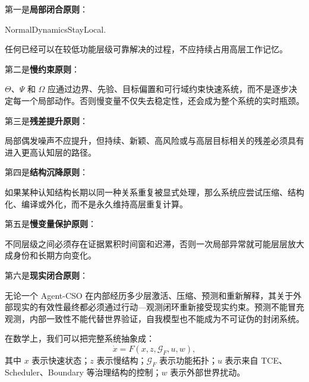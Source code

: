 第一是\textbf{局部闭合原则}：
\begin{statementbox}
NormalDynamicsStayLocal.
\end{statementbox}
任何已经可以在较低功能层级可靠解决的过程，不应持续占用高层工作记忆。

第二是\textbf{慢约束原则}：
\begin{statementbox}
\centering
{}
\end{statementbox}
$\Theta$、$\Psi$ 和 $\Omega$ 应通过边界、先验、目标偏置和可行域约束快速系统，而不是逐步决定每一个局部动作。否则慢变量不仅失去稳定性，还会成为整个系统的实时瓶颈。

第三是\textbf{残差提升原则}：
\begin{statementbox}
\centering
{}
\end{statementbox}
局部偶发噪声不应提升，但持续、新颖、高风险或与高层目标相关的残差必须具有进入更高认知层的路径。

第四是\textbf{结构沉降原则}：
\begin{statementbox}
\centering
{}
\end{statementbox}
如果某种认知结构长期以同一种关系重复被显式处理，那么系统应尝试压缩、结构化、编译或外化，而不是永久维持高层重复计算。

第五是\textbf{慢变量保护原则}：
\begin{statementbox}
\centering
{}
\end{statementbox}
不同层级之间必须存在证据累积时间窗和迟滞，否则一次局部异常就可能层层放大成身份和长期方向变化。

第六是\textbf{现实闭合原则}：
\begin{statementbox}
\centering
{}
\end{statementbox}
无论一个 Agent-CSO 在内部经历多少层激活、压缩、预测和重新解释，其关于外部现实的有效性最终都必须通过行动—观测闭环重新接受现实约束。预测不能冒充观测，内部一致性不能代替世界验证，自我模型也不能成为不可证伪的封闭系统。

在数学上，我们可以把完整系统抽象成：
\[
\dot x
=
F(x,z,\mathcal G_F,u,w),
\]
其中 $x$ 表示快速状态；$z$ 表示慢结构；$\mathcal G_F$ 表示功能拓扑；$u$ 表示来自 TCE、Scheduler、Boundary 等治理结构的控制；$w$ 表示外部世界扰动。


